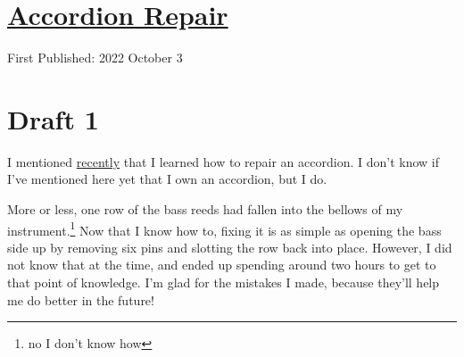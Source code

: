 \documentclass[12pt]{article}[titlepage]
\newcommand{\1}{\={a}}
\newcommand{\2}{\={e}}
\newcommand{\3}{\={\i}}
\newcommand{\4}{\=o}
\newcommand{\5}{\=u}
\newcommand{\6}{\={A}}
\renewcommand{\,}{\textsuperscript{,}}
\begin{document}
\doublespacing
\section{\href{accordion-repair.html}{Accordion Repair}}
First Published: 2022 October 3
\section{Draft 1}
I mentioned \href{twenty-four.html}{recently} that I learned how to repair an accordion.
I don't know if I've mentioned here yet that I own an accordion, but I do.

More or less, one row of the bass reeds had fallen into the bellows of my instrument.\footnote{no I don't know how}
Now that I know how to, fixing it is as simple as opening the bass side up by removing six pins and slotting the row back into place.
However, I did not know that at the time, and ended up spending around two hours to get to that point of knowledge.
I'm glad for the mistakes I made, because they'll help me do better in the future!
\end{document}
